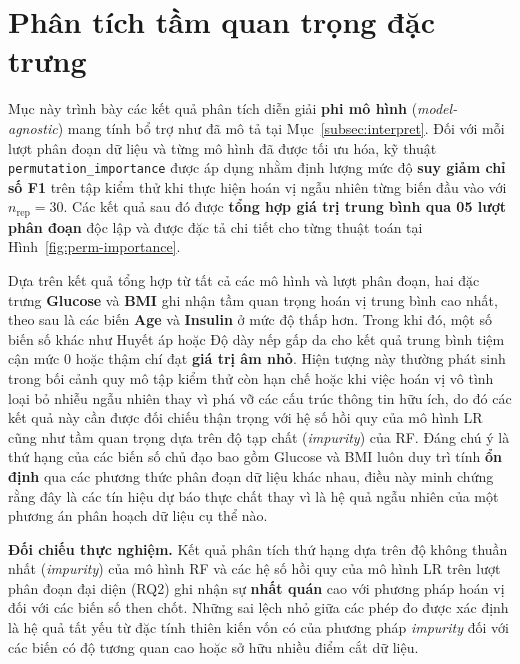 \documentclass[14pt,a4paper]{extreport}
\begin{document}
\section{Phân tích tầm quan trọng đặc trưng}
\label{subsec:permimp}

Mục này trình bày các kết quả phân tích diễn giải \textbf{phi mô hình} (\textit{model-agnostic}) mang tính bổ trợ như đã mô tả tại Mục~\ref{subsec:interpret}. Đối với mỗi lượt phân đoạn dữ liệu và từng mô hình đã được tối ưu hóa, kỹ thuật \texttt{permutation\_importance} được áp dụng nhằm định lượng mức độ \textbf{suy giảm chỉ số F1} trên tập kiểm thử khi thực hiện hoán vị ngẫu nhiên từng biến đầu vào với $n_{\mathrm{rep}}=30$. Các kết quả sau đó được \textbf{tổng hợp giá trị trung bình qua 05 lượt phân đoạn} độc lập và được đặc tả chi tiết cho từng thuật toán tại Hình~\ref{fig:perm-importance}.

Dựa trên kết quả tổng hợp từ tất cả các mô hình và lượt phân đoạn, hai đặc trưng \textbf{Glucose} và \textbf{BMI} ghi nhận tầm quan trọng hoán vị trung bình cao nhất, theo sau là các biến \textbf{Age} và \textbf{Insulin} ở mức độ thấp hơn. Trong khi đó, một số biến số khác như Huyết áp hoặc Độ dày nếp gấp da cho kết quả trung bình tiệm cận mức $0$ hoặc thậm chí đạt \textbf{giá trị âm nhỏ}. Hiện tượng này thường phát sinh trong bối cảnh quy mô tập kiểm thử còn hạn chế hoặc khi việc hoán vị vô tình loại bỏ nhiễu ngẫu nhiên thay vì phá vỡ các cấu trúc thông tin hữu ích, do đó các kết quả này cần được đối chiếu thận trọng với hệ số hồi quy của mô hình LR cũng như tầm quan trọng dựa trên độ tạp chất (\textit{impurity}) của RF. Đáng chú ý là thứ hạng của các biến số chủ đạo bao gồm Glucose và BMI luôn duy trì tính \textbf{ổn định} qua các phương thức phân đoạn dữ liệu khác nhau, điều này minh chứng rằng đây là các tín hiệu dự báo thực chất thay vì là hệ quả ngẫu nhiên của một phương án phân hoạch dữ liệu cụ thể nào.

\noindent\textbf{Đối chiếu thực nghiệm.} Kết quả phân tích thứ hạng dựa trên độ không thuần nhất (\textit{impurity}) của mô hình RF và các hệ số hồi quy của mô hình LR trên lượt phân đoạn đại diện (RQ2) ghi nhận sự \textbf{nhất quán} cao với phương pháp hoán vị đối với các biến số then chốt. Những sai lệch nhỏ giữa các phép đo được xác định là hệ quả tất yếu từ đặc tính thiên kiến vốn có của phương pháp \textit{impurity} đối với các biến có độ tương quan cao hoặc sở hữu nhiều điểm cắt dữ liệu.
\end{document}
